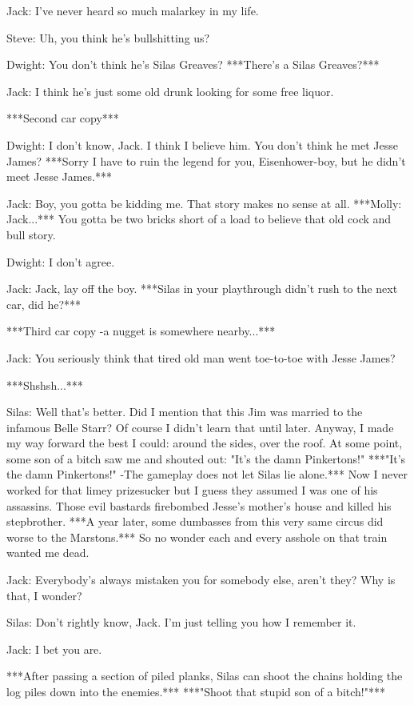 \documentclass{article}
\begin{document}
Jack: I've never heard so much malarkey in my life.

Steve: Uh, you think he's bullshitting us?

Dwight: You don't think he's Silas Greaves? ***There's a Silas Greaves?***

Jack: I think he's just some old drunk looking for some free liquor.

***Second car copy***

Dwight: I don't know, Jack. I think I believe him. You don't think he met Jesse James? ***Sorry I have to ruin the legend for you, Eisenhower-boy, but he didn't meet Jesse James.***

Jack: Boy, you gotta be kidding me. That story makes no sense at all. ***Molly: Jack...*** You gotta be two bricks short of a load to believe that old cock and bull story.

Dwight: I don't agree.

Jack: Jack, lay off the boy. ***Silas in your playthrough didn't rush to the next car, did he?***

***Third car copy -a nugget is somewhere nearby...***

Jack: You seriously think that tired old man went toe-to-toe with Jesse James?

***Shshsh...***

Silas: Well that's better. Did I mention that this Jim was married to the infamous Belle Starr? Of course I didn't learn that until later. Anyway, I made my way forward the best I could: around the sides, over the roof. At some point, some son of a bitch saw me and shouted out: "It's the damn Pinkertons!" ***"It's the damn Pinkertons!" -The gameplay does not let Silas lie alone.*** Now I never worked for that limey prizesucker but I guess they assumed I was one of his assassins. Those evil bastards firebombed Jesse's mother's house and killed his stepbrother. ***A year later, some dumbasses from this very same circus did worse to the Marstons.*** So no wonder each and every asshole on that train wanted me dead.

Jack: Everybody's always mistaken you for somebody else, aren't they? Why is that, I wonder?

Silas: Don't rightly know, Jack. I'm just telling you how I remember it.

Jack: I bet you are.

***After passing a section of piled planks, Silas can shoot the chains holding the log piles down into the enemies.*** ***"Shoot that stupid son of a bitch!"***
\end{document}
